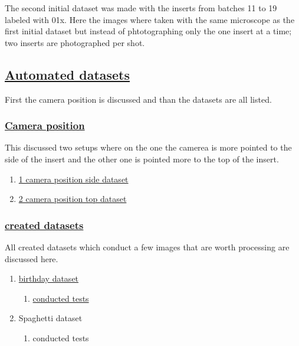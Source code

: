 \documentclass{scrartcl}
\begin{document}
	The second initial dataset was made with the inserts from batches 11 to 19 labeled with 01x. Here the images where taken with the same microscope as the first initial dataset but instead of phtotographing only the one insert at a time; two inserts are photographed per shot.
	


\subsection{\href{./Dataset/automated_datasets.tex}{Automated datasets}}

First the camera position is discussed and than the datasets are all listed.



\subsubsection{\href{./Dataset/automated_datasets/1_check_camera_position.tex}{Camera position}}

	This discussed two setups where on the one the camerea is more pointed to the side of the insert and the other one is pointed more to the top of the insert.
	
	\begin{enumerate}[1]
	\item \href{./Dataset/automated_datasets/1_check_camera_position/1_camera_position_side.tex}{1 camera position side dataset}
	\item \href{./Dataset/automated_datasets/1_check_camera_position/2_camera_position_top.tex}{2 camera position top dataset}
	\end{enumerate}


\subsubsection{\href{./Dataset/automated_datasets/2_created_datasets.tex}{created datasets}}

	All created datasets which conduct a few images that are worth processing are discussed here. 
	


	\begin{enumerate}[1]
	\item \href{./Dataset/automated_datasets/2_created_datasets/1_Birthday_dataset.tex}{birthday dataset}
		\begin{enumerate}[a]
		\item \href{./Dataset/automated_datasets/2_created_datasets/1_Birthday_dataset/conducted_tests_before_creation.tex}{conducted tests}
		\end{enumerate}
	\item Spaghetti dataset
		\begin{enumerate}[a]
		\item conducted tests
		\end{enumerate}
	\end{enumerate}
\end{document}
